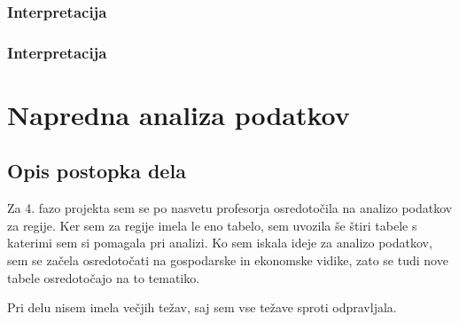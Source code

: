 \documentclass[11pt,a4paper]{article}
\begin{document}
\subsubsection{Interpretacija}

\subsubsection{Interpretacija}


\section{Napredna analiza podatkov}
\subsection{Opis postopka dela}
Za 4. fazo projekta sem se po nasvetu profesorja osredotočila na analizo podatkov za regije. Ker sem za regije imela le eno tabelo, sem uvozila še štiri tabele s katerimi sem si pomagala pri analizi. Ko sem iskala ideje za analizo podatkov, sem se začela osredotočati na gospodarske in ekonomske vidike, zato se tudi nove tabele osredotočajo na to tematiko.

Pri delu nisem imela večjih težav, saj sem vse težave sproti odpravljala.
\end{document}
